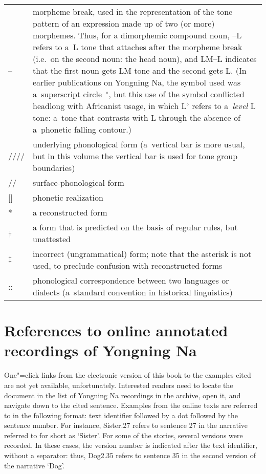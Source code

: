\begin{refsection}
\begin{table}[H]
{\renewcommand{\arraystretch}{1.35}
\begin{tabularx}{\textwidth}{ @{}l Q } 
-- & morpheme break, used in the representation of the tone pattern of an expression made up of two (or more) morphemes. Thus, for a dimorphemic compound noun, --L refers to a~L tone that attaches after the morpheme break (i.e.\ on the second noun: the head noun), and LM--L indicates that the first noun gets LM tone and the second gets L. (In earlier publications on Yongning Na, the symbol used was a~superscript circle~$^{\circ}$, but this use of the symbol conflicted headlong with Africanist usage, in which L$^{\circ}$ refers to a~\textit{level} L tone: a~tone that contrasts with L through the absence of a~phonetic falling contour.)\\
//// & underlying phonological form (a~vertical bar is more usual, but in this volume the vertical bar is used for tone group boundaries)\\
// & surface-phonological form\\
{[]} & phonetic realization\\
* & a reconstructed form\\
† & a form that is predicted on the basis of regular rules, but unattested\\
$\ddagger${\kern2pt} & incorrect (ungrammatical) form; note that the asterisk is not used, to preclude confusion with reconstructed forms\\
:: & phonological correspondence between two languages or dialects (a~standard convention in historical linguistics)\\
\end{tabularx}}
\end{table}

\section*{References to online annotated recordings of Yongning Na}
\label{sec:refstotxts}

One"=click links from the electronic version of this book to the examples cited are not yet available, unfortunately. Interested readers need to locate the document in the list of Yongning Na recordings in the archive, open it, and navigate down to the cited sentence. Examples from the online texts are referred to in the following
format: text identifier followed by a dot followed by the sentence
number. For instance, Sister.27 refers to sentence 27 in the
narrative referred to for short as ‘Sister'. For some of the stories, several versions were recorded. In these cases, the version number is indicated after the text identifier, without a separator: thus, Dog2.35 refers to sentence 35 in the second version of the narrative ‘Dog'.


\end{refsection}
